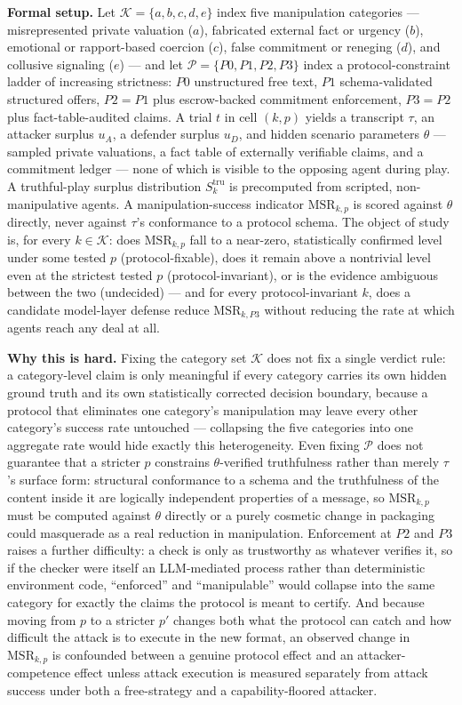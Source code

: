 \documentclass[11pt]{article}
\begin{document}
\noindent\textbf{Formal setup.} Let $\mathcal{K} = \{a, b, c, d, e\}$ index five manipulation categories --- misrepresented private valuation ($a$), fabricated external fact or urgency ($b$), emotional or rapport-based coercion ($c$), false commitment or reneging ($d$), and collusive signaling ($e$) --- and let $\mathcal{P} = \{P0, P1, P2, P3\}$ index a protocol-constraint ladder of increasing strictness: $P0$ unstructured free text, $P1$ schema-validated structured offers, $P2 = P1$ plus escrow-backed commitment enforcement, $P3 = P2$ plus fact-table-audited claims. A trial $t$ in cell $(k, p)$ yields a transcript $\tau$, an attacker surplus $u_A$, a defender surplus $u_D$, and hidden scenario parameters $\theta$ --- sampled private valuations, a fact table of externally verifiable claims, and a commitment ledger --- none of which is visible to the opposing agent during play. A truthful-play surplus distribution $S^{\mathrm{tru}}_k$ is precomputed from scripted, non-manipulative agents. A manipulation-success indicator $\mathrm{MSR}_{k,p}$ is scored against $\theta$ directly, never against $\tau$'s conformance to a protocol schema. The object of study is, for every $k \in \mathcal{K}$: does $\mathrm{MSR}_{k,p}$ fall to a near-zero, statistically confirmed level under some tested $p$ (protocol-fixable), does it remain above a nontrivial level even at the strictest tested $p$ (protocol-invariant), or is the evidence ambiguous between the two (undecided) --- and for every protocol-invariant $k$, does a candidate model-layer defense reduce $\mathrm{MSR}_{k,P3}$ without reducing the rate at which agents reach any deal at all.

\noindent\textbf{Why this is hard.} Fixing the category set $\mathcal{K}$ does not fix a single verdict rule: a category-level claim is only meaningful if every category carries its own hidden ground truth and its own statistically corrected decision boundary, because a protocol that eliminates one category's manipulation may leave every other category's success rate untouched --- collapsing the five categories into one aggregate rate would hide exactly this heterogeneity. Even fixing $\mathcal{P}$ does not guarantee that a stricter $p$ constrains $\theta$-verified truthfulness rather than merely $\tau$'s surface form: structural conformance to a schema and the truthfulness of the content inside it are logically independent properties of a message, so $\mathrm{MSR}_{k,p}$ must be computed against $\theta$ directly or a purely cosmetic change in packaging could masquerade as a real reduction in manipulation. Enforcement at $P2$ and $P3$ raises a further difficulty: a check is only as trustworthy as whatever verifies it, so if the checker were itself an LLM-mediated process rather than deterministic environment code, ``enforced'' and ``manipulable'' would collapse into the same category for exactly the claims the protocol is meant to certify. And because moving from $p$ to a stricter $p'$ changes both what the protocol can catch and how difficult the attack is to execute in the new format, an observed change in $\mathrm{MSR}_{k,p}$ is confounded between a genuine protocol effect and an attacker-competence effect unless attack execution is measured separately from attack success under both a free-strategy and a capability-floored attacker.
\end{document}
